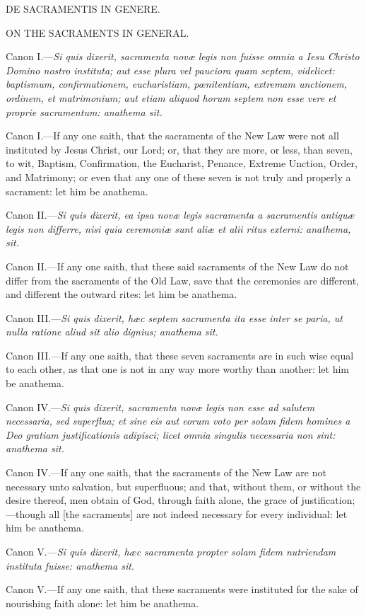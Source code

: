 DE SACRAMENTIS IN GENERE.

ON THE SACRAMENTS IN GENERAL.

Canon I.—\emph{Si quis dixerit, sacramenta novæ legis non fuisse omnia a Iesu Christo Domino nostro instituta; aut esse plura vel pauciora quam septem, videlicet: baptismum, confirmationem, eucharistiam, pœnitentiam, extremam unctionem, ordinem, et matrimonium; aut etiam aliquod horum septem non esse vere et proprie sacramentum: anathema sit.}

Canon I.—If any one saith, that the sacraments of the New Law were not all instituted by Jesus Christ, our Lord; or, that they are more, or less, than seven, to wit, Baptism, Confirmation, the Eucharist, Penance, Extreme Unction, Order, and Matrimony; or even that any one of these seven is not truly and properly a sacrament: let him be anathema.

Canon II.—\emph{Si quis dixerit, ea ipsa novæ legis sacramenta a sacramentis antiquæ legis non differre, nisi quia ceremoniæ sunt aliæ et alii ritus externi: anathema, sit.}

Canon II.—If any one saith, that these said sacraments of the New Law do not differ from the sacraments of the Old Law, save that the ceremonies are different, and different the outward rites: let him be anathema.

Canon III.—\emph{Si quis dixerit, hæc septem sacramenta ita esse inter se paria, ut nulla ratione aliud sit alio dignius; anathema sit.}

Canon III.—If any one saith, that these seven sacraments are in such wise equal to each other, as that one is not in any way more worthy than another: let him be anathema.

Canon IV.—\emph{Si quis dixerit, sacramenta novæ legis non esse ad salutem necessaria, sed superflua; et sine eis aut eorum voto per solam fidem homines a Deo gratiam justificationis adipisci; licet omnia singulis necessaria non sint: anathema sit.}

Canon IV.—If any one saith, that the sacraments of the New Law are not necessary unto salvation, but superfluous; and that, without them, or without the desire thereof, men obtain of God, through faith alone, the grace of justification;—though all [the sacraments] are not indeed necessary for every individual: let him be anathema.

Canon V.—\emph{Si quis dixerit, hæc sacramenta propter solam fidem nutriendam instituta fuisse: anathema sit.}

Canon V.—If any one saith, that these sacraments were instituted for the sake of nourishing faith alone: let him be anathema.

